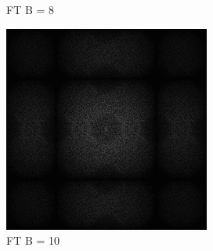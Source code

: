 \begin{figure}[H]
\begin{tcolorbox}[boxrule=4pt,sharp corners=downhill,title=Verschiedene Blockgrößen]
\begin{subfigure}[b]{0.2\linewidth}
      \caption{FT B = 8}
      \label{pic:fftB_8}
    \end{subfigure}
    \begin{subfigure}[b]{0.2\linewidth}
        \includegraphics[width=\linewidth]{content/TemporalerAlg/Bilder/Sorting/DiffDimensions/10/seed_debug_5.0_small.png}
        \caption{FT B = 10}
        \label{pic:fftB_10}
    \end{subfigure}
    \begin{subfigure}[b]{0.2\linewidth}

\end{subfigure}
\end{tcolorbox}
\end{figure}
